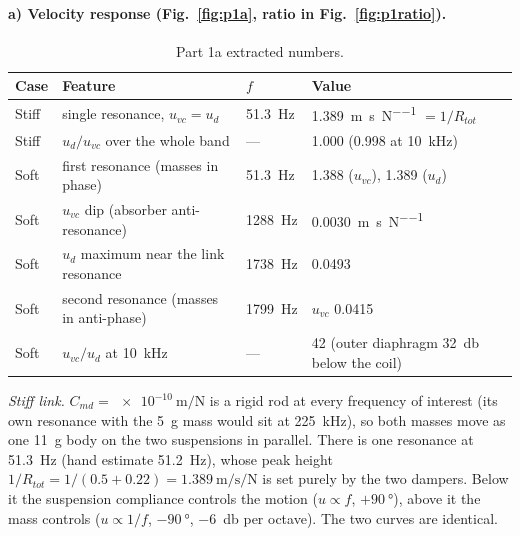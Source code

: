 \documentclass[a4paper,11pt]{article}
\begin{document}
\paragraph{a) Velocity response (Fig.~\ref{fig:p1a}, ratio in Fig.~\ref{fig:p1ratio}).}
\begin{table}[H]\centering\small
\begin{tabular}{@{}llll@{}}\toprule
Case & Feature & $f$ & Value \\ \midrule
Stiff & single resonance, $u_{vc}=u_d$ & \SI{51.3}{\hertz} & \SI{1.389}{\metre\per\second\per\newton} $= 1/R_{tot}$ \\
Stiff & $u_d/u_{vc}$ over the whole band & --- & 1.000 (0.998 at \SI{10}{\kilo\hertz}) \\
Soft & first resonance (masses in phase) & \SI{51.3}{\hertz} & 1.388 ($u_{vc}$), 1.389 ($u_d$) \\
Soft & $u_{vc}$ dip (absorber anti-resonance) & \SI{1288}{\hertz} & \SI{0.0030}{\metre\per\second\per\newton} \\
Soft & $u_d$ maximum near the link resonance & \SI{1738}{\hertz} & 0.0493 \\
Soft & second resonance (masses in anti-phase) & \SI{1799}{\hertz} & $u_{vc}$ 0.0415 \\
Soft & $u_{vc}/u_d$ at \SI{10}{\kilo\hertz} & --- & 42 (outer diaphragm \SI{32}{\decibel} below the coil) \\
\bottomrule\end{tabular}
\caption{Part 1a extracted numbers.}
\end{table}

\emph{Stiff link.} $C_{md} = \SI{e-10}{\metre\per\newton}$ is a rigid rod at every frequency of interest (its own
resonance with the \SI{5}{\gram} mass would sit at \SI{225}{\kilo\hertz}), so both masses move as one \SI{11}{\gram}
body on the two suspensions in parallel. There is one resonance at \SI{51.3}{\hertz} (hand estimate \SI{51.2}{\hertz}),
whose peak height $1/R_{tot} = 1/(0.5+0.22) = \SI{1.389}{\metre\per\second\per\newton}$ is set purely by the two
dampers. Below it the suspension compliance controls the motion ($u\propto f$, $+\SI{90}{\degree}$), above it the mass
controls ($u\propto 1/f$, $-\SI{90}{\degree}$, \SI{-6}{\decibel} per octave). The two curves are identical.
\end{document}
